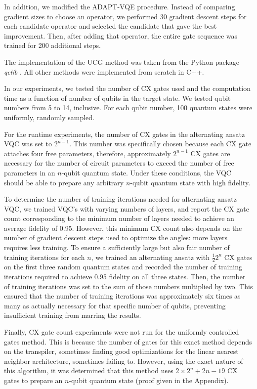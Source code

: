 \documentclass{article}
\begin{document}
In addition, we modified the ADAPT-VQE procedure. Instead of comparing gradient
sizes to choose an operator, we performed 30 gradient descent steps for each
candidate operator and selected the candidate that gave the best
improvement. Then, after adding that operator, the entire gate sequence was
trained for 200 additional steps. 

The implementation of the UCG method
was taken from the Python package \textit{qclib} \cite{Araujo_Quantum_computing_library_2023}. All other methods were 
implemented from scratch in C++. 

In our experiments, we tested the number of CX gates used and the computation
time as a function of number of qubits in the target state. We tested qubit
numbers from 5 to 14, inclusive. For each qubit number, 100 quantum states were
uniformly, randomly sampled.

For the runtime experiments, the number of CX gates in the alternating
ansatz VQC was set to $2^{n - 1}$. This number was specifically chosen
because each CX gate attaches four free parameters, therefore, approximately
$2^{n - 1}$ CX gates are necessary for the number of circuit parameters to
exceed the number of free parameters in an $n$-qubit quantum state. Under these
conditions, the VQC should be able to prepare any arbitrary $n$-qubit quantum 
state with high fidelity.

To determine the number of training iterations needed for alternating ansatz 
VQC, we trained VQC's with varying numbers of layers, and report the CX gate 
count corresponding to the minimum number of layers needed to achieve an average
fidelity of 0.95. However, this minimum CX count also depends on the number of 
gradient descent steps used to optimize the angles: more layers requires less
training. To ensure a sufficiently large but also fair number of training 
iterations for each $n$, we trained an
alternating ansatz with $\frac{1}{2}2^n$ CX gates on the first three random
quantum states and recorded the number of training iterations required to
achieve 0.95 fidelity on all three states. Then, the number of training
iterations was set to the sum of those numbers multiplied by two. This ensured
that the number of training iterations was approximately six times as many as
actually necessary for that specific number of qubits, preventing insufficient
training from marring the results.

Finally, CX gate count experiments were not run for the uniformly controlled 
gates method. This is because the number of gates for this exact method depends
on the transpiler, sometimes finding good optimizations for the
linear nearest neighbor architecture, sometimes failing to. However, using the
exact nature of this algorithm, it was determined that this method uses
$2\times 2^n + 2n - 19$ CX gates to prepare an $n$-qubit quantum state (proof given in the Appendix). 
\end{document}
